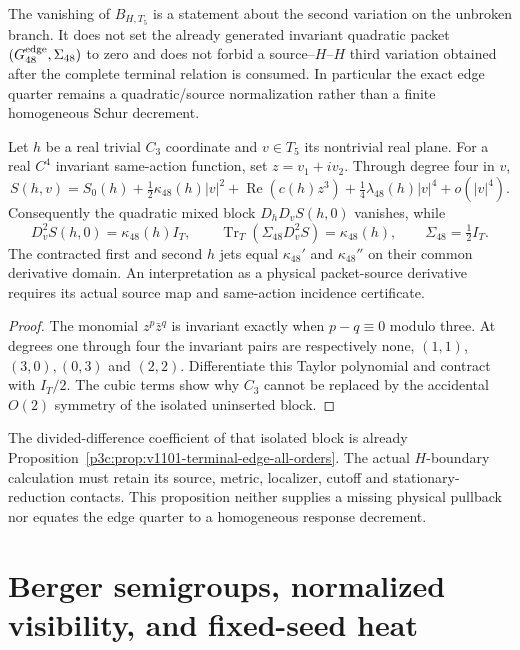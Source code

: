 \documentclass[12pt,a4paper]{article}
\begin{document}
\begin{remark}
\label{p3c:rem:v193-k48-higher-jet-firewall}
The vanishing of $B_{H,T_5}$ is a statement about the second variation on the
unbroken branch.  It does not set the already generated invariant quadratic
packet $(G_{48}^{\rm edge},\Sigma_{48})$ to zero and does not forbid a
source--$H$--$H$ third variation obtained after the complete terminal relation
is consumed.  In particular the exact edge quarter remains a quadratic/source
normalization rather than a finite homogeneous Schur decrement.
\end{remark}
\begin{proposition}
\label{p3c:prop:v257-k48-invariant-jets}
Let $h$ be a real trivial $C_3$ coordinate and $v\in T_5$ its nontrivial
real plane. For a real $C^4$ invariant same-action function, set
$z=v_1+iv_2$. Through degree four in $v$,
\[
 S(h,v)=S_0(h)+\tfrac12\kappa_{48}(h)|v|^2
       +\operatorname{Re}(c(h)z^3)+\tfrac14\lambda_{48}(h)|v|^4
       +o(|v|^4).
\]
Consequently the quadratic mixed block $D_hD_vS(h,0)$ vanishes, while
\[
 D_v^2S(h,0)=\kappa_{48}(h)I_T,\qquad
 \operatorname{Tr}_T(\Sigma_{48}D_v^2S)=\kappa_{48}(h),
 \qquad\Sigma_{48}=\tfrac12I_T.
\]
The contracted first and second $h$ jets equal $\kappa_{48}'$ and
$\kappa_{48}''$ on their common derivative domain. An interpretation
as a physical packet-source derivative requires its actual source map
and same-action incidence certificate.
\end{proposition}
\begin{proof}
The monomial $z^p\bar z^q$ is invariant exactly when $p-q\equiv0$
modulo three. At degrees one through four the invariant pairs are
respectively none, $(1,1)$, $(3,0),(0,3)$ and $(2,2)$.
Differentiate this Taylor polynomial and contract with $I_T/2$.
The cubic terms show why $C_3$ cannot be replaced by the accidental
$O(2)$ symmetry of the isolated uninserted block.
\end{proof}
The divided-difference coefficient of that isolated block is already
Proposition~\ref{p3c:prop:v1101-terminal-edge-all-orders}. The actual
$H$-boundary calculation must retain its source, metric, localizer,
cutoff and stationary-reduction contacts. This proposition neither
supplies a missing physical pullback nor equates the edge quarter to
a homogeneous response decrement.


\section{Berger semigroups, normalized visibility, and fixed-seed heat}
\label{p3c:sec:v2216-collapse-visibility}
\end{document}
